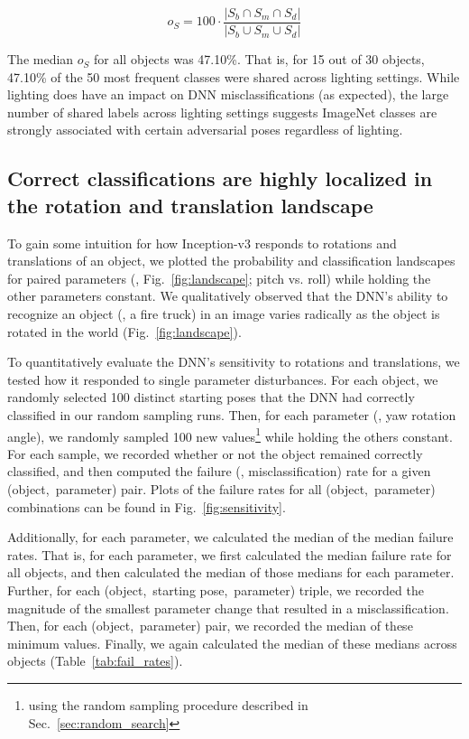 \documentclass[10pt,twocolumn,letterpaper]{article}
\newcommand{\subsec}[1]{\noindent{\textbf{#1.}}}
\begin{document}
\vspace*{-0.3cm}
\begin{equation}
o_{S} = 100 \cdot \frac{|S_{b} \cap S_{m} \cap S_{d}|}{|  S_{b} \cup S_{m} \cup S_{d} |}
\end{equation}


\noindent
The median $o_{S}$ for all objects was 47.10\%.
That is, for 15 out of 30 objects, 47.10\% of the 50 most frequent classes were shared across lighting settings.
While lighting does have an impact on DNN misclassifications (as expected), the large number of shared labels across lighting settings suggests ImageNet classes are strongly associated with certain adversarial poses regardless of lighting.

\subsection{Correct classifications are highly localized in the rotation and translation landscape}
\label{sec:landscape}

To gain some intuition for how Inception-v3 responds to rotations and translations of an object, we plotted the probability and classification landscapes for paired parameters (\eg, Fig.~\ref{fig:landscape}; pitch vs. roll) while holding the other parameters constant.
We qualitatively observed that the DNN's ability to recognize an object (\eg, a fire truck) in an image varies radically as the object is rotated in the world (Fig.~\ref{fig:landscape}).


\subsec{Experiment}
To quantitatively evaluate the DNN's sensitivity to rotations and translations, we tested how it responded to single parameter disturbances.
For each object, we randomly selected 100 distinct starting poses that the DNN had correctly classified in our random sampling runs.
Then, for each parameter (\eg, yaw rotation angle), we randomly sampled 100 new values\footnote{\label{note:sampling}using the random sampling procedure described in Sec.~\ref{sec:random_search}} while holding the others constant.
For each sample, we recorded whether or not the object remained correctly classified, and then computed the failure (\ie, misclassification) rate for a given (object,~parameter) pair.
Plots of the failure rates for all (object,~parameter) combinations can be found in Fig.~\ref{fig:sensitivity}.

Additionally, for each parameter, we calculated the median of the median failure rates.
That is, for each parameter, we first calculated the median failure rate for all objects, and then calculated the median of those medians for each parameter.
Further, for each (object,~starting pose,~parameter) triple, we recorded the magnitude of the smallest parameter change that resulted in a misclassification.
Then, for each (object,~parameter) pair, we recorded the median of these minimum values.
Finally, we again calculated the median of these medians across objects (Table~\ref{tab:fail_rates}).
\end{document}
